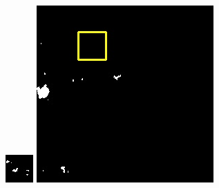 \documentclass[10pt]{ctexart}
\begin{document}
\begin{multicols}{2}
\begin{figure}[H]
{\begin{minipage}[b]{0.15\linewidth}
            \includegraphics[width=1\linewidth]{../log/spoon2/cut2/tmp_cut_LC81620432014072LGN00_16237_mask.jpg}\vspace{4pt}
            \includegraphics[width=1\linewidth]{../log/spoon2/cut2/LC81620432014072LGN00_16329_mask.jpg}\vspace{4pt}

\end{minipage}}
\end{figure}
\end{multicols}
\end{document}

